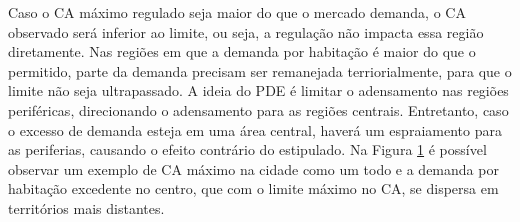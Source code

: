 

Caso o CA máximo regulado seja maior do que o mercado demanda, o CA observado será inferior ao limite, ou seja, a regulação não impacta essa região diretamente. Nas regiões em que a demanda por habitação é maior do que o permitido, parte da demanda precisam ser remanejada terriorialmente, para que o limite não seja ultrapassado. A ideia do PDE é limitar o adensamento nas regiões periféricas, direcionando o adensamento para as regiões centrais. Entretanto, caso o excesso de demanda esteja em uma área central, haverá um espraiamento para as periferias, causando o efeito contrário do estipulado. Na Figura \ref{fig:FAR} é possível observar um exemplo de CA máximo na cidade como um todo e a demanda por habitação excedente no centro, que com o limite máximo no CA, se dispersa em territórios mais distantes.

\begin{figure}[h]
    \caption{Impacto da regulação no CA da cidade}
    \centering
    \begin{subfigure}{.6\linewidth}
        
    \end{subfigure}
    \label{fig:FAR}
\end{figure}

